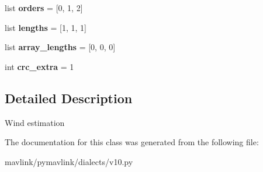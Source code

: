 \begin{DoxyCompactItemize}
\mbox{\label{classpymavlink_1_1dialects_1_1v10_1_1MAVLink__wind__message_ae2d536f969acf8aa5415e9b8a7e3c87a}} 
list {\bfseries orders} = \mbox{[}0, 1, 2\mbox{]}
\item 
\mbox{\label{classpymavlink_1_1dialects_1_1v10_1_1MAVLink__wind__message_a0da186ddc64182ca50a271cafb78f711}} 
list {\bfseries lengths} = \mbox{[}1, 1, 1\mbox{]}
\item 
\mbox{\label{classpymavlink_1_1dialects_1_1v10_1_1MAVLink__wind__message_a78bcb7b06c239464a4198ac0e783e7f1}} 
list {\bfseries array\+\_\+lengths} = \mbox{[}0, 0, 0\mbox{]}
\item 
\mbox{\label{classpymavlink_1_1dialects_1_1v10_1_1MAVLink__wind__message_a183b3ee9bacccf8d6729d64c3f543f40}} 
int {\bfseries crc\+\_\+extra} = 1
\end{DoxyCompactItemize}


\subsection{Detailed Description}
\begin{DoxyVerb}Wind estimation
\end{DoxyVerb}
 

The documentation for this class was generated from the following file\+:\begin{DoxyCompactItemize}
\item 
mavlink/pymavlink/dialects/v10.\+py\end{DoxyCompactItemize}
